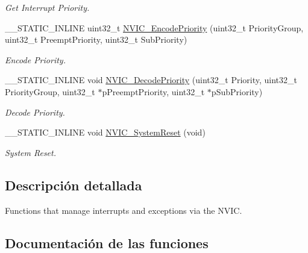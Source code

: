 \begin{DoxyCompactItemize}
\begin{DoxyCompactList}\small\item\em Get Interrupt Priority. \end{DoxyCompactList}\item 
\+\_\+\+\_\+\+S\+T\+A\+T\+I\+C\+\_\+\+I\+N\+L\+I\+NE uint32\+\_\+t \mbox{\hyperlink{group___c_m_s_i_s___core___n_v_i_c_functions_gadb94ac5d892b376e4f3555ae0418ebac}{N\+V\+I\+C\+\_\+\+Encode\+Priority}} (uint32\+\_\+t Priority\+Group, uint32\+\_\+t Preempt\+Priority, uint32\+\_\+t Sub\+Priority)
\begin{DoxyCompactList}\small\item\em Encode Priority. \end{DoxyCompactList}\item 
\+\_\+\+\_\+\+S\+T\+A\+T\+I\+C\+\_\+\+I\+N\+L\+I\+NE void \mbox{\hyperlink{group___c_m_s_i_s___core___n_v_i_c_functions_ga4f23ef94633f75d3c97670a53949003c}{N\+V\+I\+C\+\_\+\+Decode\+Priority}} (uint32\+\_\+t Priority, uint32\+\_\+t Priority\+Group, uint32\+\_\+t $\ast$p\+Preempt\+Priority, uint32\+\_\+t $\ast$p\+Sub\+Priority)
\begin{DoxyCompactList}\small\item\em Decode Priority. \end{DoxyCompactList}\item 
\+\_\+\+\_\+\+S\+T\+A\+T\+I\+C\+\_\+\+I\+N\+L\+I\+NE void \mbox{\hyperlink{group___c_m_s_i_s___core___n_v_i_c_functions_ga1143dec48d60a3d6f238c4798a87759c}{N\+V\+I\+C\+\_\+\+System\+Reset}} (void)
\begin{DoxyCompactList}\small\item\em System Reset. \end{DoxyCompactList}\end{DoxyCompactItemize}


\subsection{Descripción detallada}
Functions that manage interrupts and exceptions via the N\+V\+IC. 



\subsection{Documentación de las funciones}
\mbox{\label{group___c_m_s_i_s___core___n_v_i_c_functions_ga332e10ef9605dc6eb10b9e14511930f8}} 
